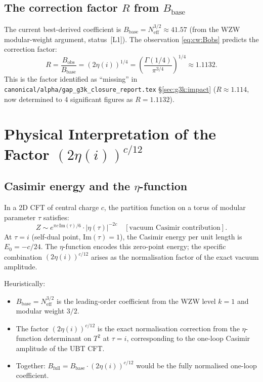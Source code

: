 \documentclass[12pt,a4paper]{article}
\theoremstyle{definition}
\theoremstyle{remark}
\begin{document}
\subsection{The correction factor $R$ from $B_{\mathrm{base}}$}

The current best-derived coefficient is $B_{\mathrm{base}} = N_{\mathrm{eff}}^{3/2}
\approx 41.57$ (from the WZW modular-weight argument, status~[L1]).
The observation \eqref{eq:cw:Bobs} predicts the correction factor:
\begin{equation}
  R = \frac{B_{\mathrm{obs}}}{B_{\mathrm{base}}}
    = (2\eta(i))^{1/4}
    = \left(\frac{\Gamma(1/4)}{\pi^{3/4}}\right)^{1/4}
    \approx 1.1132.
  \label{eq:cw:R}
\end{equation}
This is the factor identified as ``missing'' in
\texttt{canonical/alpha/gap\_g3k\_closure\_report.tex} §\ref{sec:g3k:impact}
($R \approx 1.114$, now determined to 4 significant figures as $R = 1.1132$).

\section{Physical Interpretation of the Factor $(2\eta(i))^{c/12}$}
\label{sec:cw:interp}

\subsection{Casimir energy and the $\eta$-function}

In a 2D CFT of central charge $c$, the partition function on a torus of
modular parameter $\tau$ satisfies:
\begin{equation}
  Z \sim e^{\pi c \,\mathrm{Im}(\tau)/6} \cdot |\eta(\tau)|^{-2c}
  \quad [\text{vacuum Casimir contribution}].
  \label{eq:cw:Casimir_Z}
\end{equation}
At $\tau = i$ (self-dual point, $\mathrm{Im}(\tau) = 1$), the Casimir
energy per unit length is $E_0 = -c/24$.  The $\eta$-function encodes
this zero-point energy; the specific combination $(2\eta(i))^{c/12}$ arises
as the normalisation factor of the exact vacuum amplitude.

Heuristically:
\begin{itemize}
  \item $B_{\mathrm{base}} = N_{\mathrm{eff}}^{3/2}$ is the leading-order
        coefficient from the WZW level $k = 1$ and modular weight $3/2$.
  \item The factor $(2\eta(i))^{c/12}$ is the exact normalisation correction
        from the $\eta$-function determinant on $T^2$ at $\tau = i$,
        corresponding to the one-loop Casimir amplitude of the UBT CFT.
  \item Together: $B_{\mathrm{full}} = B_{\mathrm{base}} \cdot (2\eta(i))^{c/12}$
        would be the fully normalised one-loop coefficient.
\end{itemize}
\end{document}
